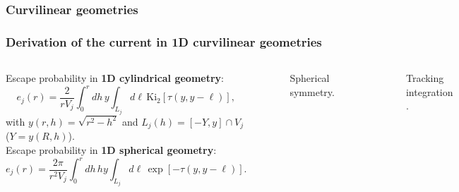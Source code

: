 \documentclass[black]{slideCEA}
\begin{document}
\subsubsection{Curvilinear geometries}
\begin{frame}
  \frametitle{Derivation of the current in 1D curvilinear geometries}
  \vspace{-5mm}
  \begin{columns}
  {
  Escape probability in \textcolor{ceablue1}{\bf 1D cylindrical geometry}:
  \[
    e_j(r) = \frac{2}{r V_j} \int_0^r { dh\, y \int_{L_j}{
    d \ell \, \text{Ki}_2\left[\tau( y, y - \ell )\right]}},
  \]
  with $y(r, h) = \sqrt{r^2 - h^2}$ and $L_j(h) = [-Y,y] \cap V_j$
  ($Y = y(R, h)$).\\[10mm]
  Escape probability in \textcolor{ceablue1}{\bf 1D spherical geometry}:
  \[
    e_j(r) = \frac{2\pi}{r^2 V_j} \int_0^r { dh\, h y \int_{L_j}{
    d \ell \, \exp\left[-\tau( y, y - \ell )\right]}}.
  \]
  \begin{figure}
    \centering
    
    \caption{Spherical symmetry.}
  \end{figure}
  }
  \vspace{-10mm}
  \begin{figure}
  \centering
  \scalebox{1.5}{
    
  }
  \caption{Tracking integration \cite{hebert2009applied}.}
  \end{figure}
\end{columns}
\end{frame}


\end{document}
